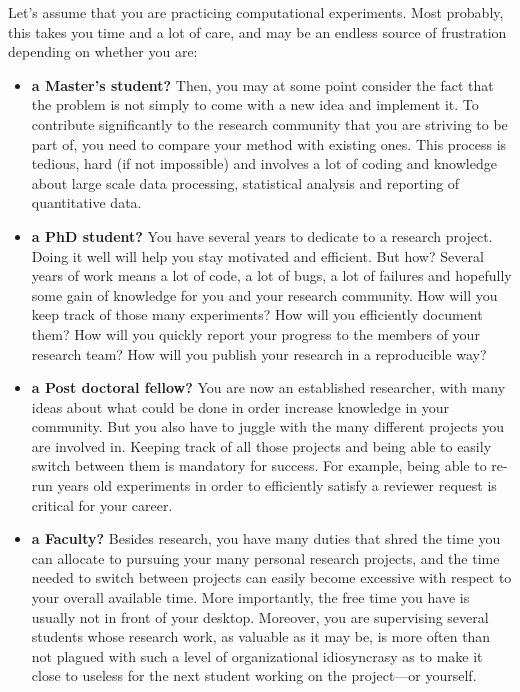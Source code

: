 \documentclass[a4paper,fleqn]{tufte-handout}
\begin{document}
Let's assume that you are practicing computational experiments. Most probably, this takes you time and a lot of care, and may be an endless source of frustration depending on whether you are:
\begin{itemize}
\item  \textbf{a Master's student?} Then, you may at some point consider the fact that the problem is not simply to come with a new idea and implement it. To contribute significantly to the research community that you are striving to be part of, you need to compare your method with existing ones. This process is tedious, hard (if not impossible) and involves a lot of coding and knowledge about large scale data processing, statistical analysis and reporting of quantitative data.

\item \textbf{a PhD student?} You have several years to dedicate to a research project. Doing it well will help you stay motivated and efficient. But how? Several years of work means a lot of code, a lot of bugs, a lot of failures and hopefully some gain of knowledge for you and your research community. How will you keep track of those many experiments? How will you efficiently document them?  How will you quickly report your progress to the members of your research team? How will you publish your research in a reproducible way?

\item \textbf{a Post doctoral fellow?} You are now an established researcher, with many ideas about what could be done in order increase knowledge in your community. But you also have to juggle with the many different projects you are involved in. Keeping track of all those projects and being able to easily switch between them is mandatory for success. For example, being able to re-run years old experiments in order to efficiently satisfy a reviewer request is critical for your career.

\item \textbf{a Faculty?} Besides research, you have many duties that shred the time you can allocate to pursuing your many personal research projects, and the time needed to switch between projects can easily become excessive with respect to your overall available time. More importantly, the free time you have is usually not in front of your desktop. Moreover, you are supervising several students whose research work, as valuable as it may be, is more often than not plagued with such a level of organizational idiosyncrasy as to make it close to useless for the next student working on the project---or yourself.

\end{itemize}
\end{document}
